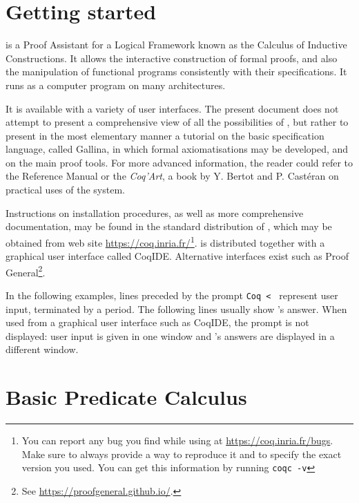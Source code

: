 \documentclass[11pt,a4paper]{book}
\begin{document}


\chapter*{Getting started}

\Coq{} is a Proof Assistant for a Logical Framework known as the Calculus
of Inductive Constructions. It allows the interactive construction of
formal proofs, and also the manipulation of functional programs 
consistently with their specifications. It runs as a computer program
on many architectures.

It is available with a variety of user interfaces. The present
document does not attempt to present a comprehensive view of all the
possibilities of \Coq, but rather to present in the most elementary
manner a tutorial on the basic specification language, called Gallina,
in which formal axiomatisations may be developed, and on the main
proof tools.  For more advanced information, the reader could refer to
the \Coq{} Reference Manual or the \textit{Coq'Art}, a book by Y.
Bertot and P. Castéran on practical uses of the \Coq{} system.

Instructions on installation procedures, as well as more comprehensive
documentation, may be found in the standard distribution of \Coq,
which may be obtained from \Coq{} web site
\url{https://coq.inria.fr/}\footnote{You can report any bug you find
while using \Coq{} at \url{https://coq.inria.fr/bugs}. Make sure to
always provide a way to reproduce it and to specify the exact version
you used. You can get this information by running \texttt{coqc -v}}.
\Coq{} is distributed together with a graphical user interface called
CoqIDE. Alternative interfaces exist such as
Proof General\footnote{See \url{https://proofgeneral.github.io/}.}.

In the following examples, lines preceded by the prompt \verb:Coq < :
represent user input, terminated by a period.
The following lines usually show \Coq's answer.
When used from a graphical user interface such as
CoqIDE, the prompt is not displayed: user input is given in one window
and \Coq's answers are displayed in a different window.

\chapter{Basic Predicate Calculus}
\end{document}
